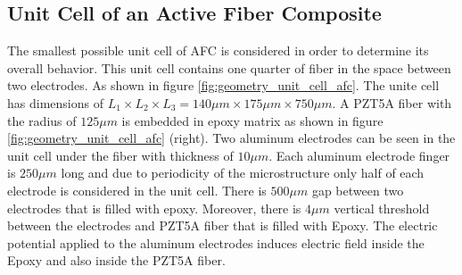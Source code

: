 \subsection{Unit Cell of an Active Fiber Composite}
The smallest possible unit cell of AFC is considered in order to determine its overall behavior.
This unit cell contains one quarter of fiber in the space between two electrodes.
As shown in figure \ref{fig:geometry_unit_cell_afc}.
The unite cell has dimensions of $L_1 \times L_2 \times L_3 =140 \mu m \times 175 \mu m \times 750 \mu m$.
A PZT5A fiber with the radius of $125 \mu m$ is embedded in epoxy matrix as shown in figure \ref{fig:geometry_unit_cell_afc} (right).
Two aluminum electrodes can be seen in the unit cell under the fiber with thickness of $10 \mu m$. 
Each aluminum electrode finger is $250 \mu m$ long and due to periodicity of the microstructure only half of each electrode is considered in the unit cell.
There is $500 \mu m$ gap between two electrodes that is filled with epoxy.
Moreover, there is $4 \mu m$ vertical threshold between the electrodes and PZT5A fiber that is filled with Epoxy.
The electric potential applied to the aluminum electrodes induces electric field inside the Epoxy and also inside the PZT5A fiber.

